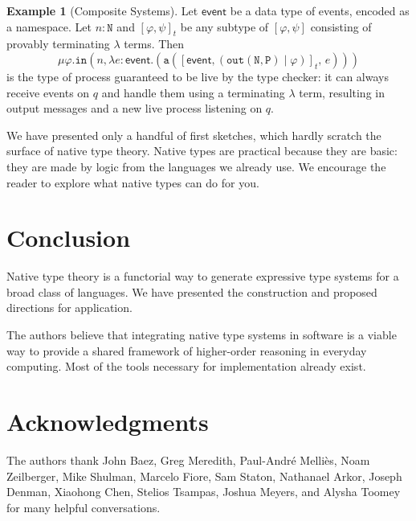\documentclass[12pt]{article}
\theoremstyle{definition}
\newtheorem{example}[theorem]{Example}
\newcommand{\msf}[1]{\mathsf{#1}}
\newcommand{\mtt}[1]{\mathtt{#1}}
\newcommand{\N}{\mtt{N}}
\newcommand{\PP}{\mtt{P}}
\newcommand{\tto}{\mtt{out}}
\begin{document}
\begin{example}[Composite Systems]
Let $\msf{event}$ be a data type of events, encoded as a namespace. Let $n:\N$ and $[\varphi,\psi]_t$ be any subtype of $[\varphi,\psi]$ consisting of provably terminating $\lambda$ terms.  Then 
$$\mu \varphi.\mtt{in}(n, \lambda e:\msf{event}.(\mtt{a}([\msf{event}, (\tto(\N, \PP) \;|\; \varphi)]_t,\, e)))$$
is the type of process guaranteed to be live by the type checker: it can always receive events on $q$ and handle them using a terminating $\lambda$ term, resulting in output messages and a new live process listening on $q$.
\end{example}

We have presented only a handful of first sketches, which hardly scratch the surface of native type theory. Native types are practical because they are basic: they are made by logic from the languages we already use. We encourage the reader to explore what native types can do for you.



\section{Conclusion}
Native type theory is a functorial way to generate expressive type systems for a broad class of languages. We have presented the construction and proposed directions for application.

The authors believe that integrating native type systems in software is a viable way to provide a shared framework of higher-order reasoning in everyday computing. Most of the tools necessary for implementation already exist.



\section*{Acknowledgments}
The authors thank John Baez, Greg Meredith, Paul-Andr{\'{e}} Melli{\`{e}}s, Noam Zeilberger, Mike Shulman, Marcelo Fiore, Sam Staton, Nathanael Arkor, Joseph Denman, Xiaohong Chen, Stelios Tsampas, Joshua Meyers, and Alysha Toomey for many helpful conversations.
%



\end{document}
